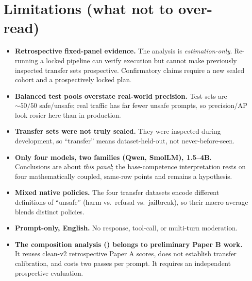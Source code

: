 \documentclass[11pt]{article}
\begin{document}
\section{Limitations (what not to over-read)}
\begin{itemize}
\item \textbf{Retrospective fixed-panel evidence.} The analysis is \emph{estimation-only}.
Re-running a locked pipeline can verify execution but cannot make previously inspected transfer
sets prospective. Confirmatory claims require a new sealed cohort and a prospectively locked plan.
\item \textbf{Balanced test pools overstate real-world precision.} Test sets are ${\sim}50/50$
safe/unsafe; real traffic has far fewer unsafe prompts, so precision/AP look rosier here than
in production.
\item \textbf{Transfer sets were not truly sealed.} They were inspected during development, so
``transfer'' means dataset-held-out, not never-before-seen.
\item \textbf{Only four models, two families (Qwen, SmolLM), 1.5--4B.} Conclusions are about
\emph{this panel}; the base-competence interpretation rests on four mathematically coupled,
same-row points and remains a hypothesis.
\item \textbf{Mixed native policies.} The four transfer datasets encode different definitions
of ``unsafe'' (harm vs.\ refusal vs.\ jailbreak), so their macro-average blends distinct
policies.
\item \textbf{Prompt-only, English.} No response, tool-call, or multi-turn moderation.
\item \textbf{The composition analysis () belongs to preliminary Paper B work.}
It reuses clean-v2 retrospective Paper A scores, does not establish transfer calibration, and costs two
passes per prompt. It requires an independent prospective evaluation.
\end{itemize}

\end{document}
